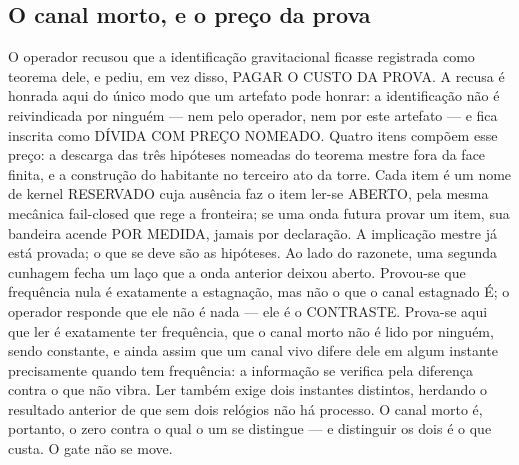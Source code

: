 \documentclass[11pt]{article}
\theoremstyle{definition}\newtheorem{deriv}{Derivação}
\begin{document}
\subsection*{O canal morto, e o pre\c{c}o da prova}O operador recusou que a identifica\c{c}\~ao gravitacional ficasse registrada como teorema dele, e pediu, em vez disso, PAGAR O CUSTO DA PROVA. A recusa \'e honrada aqui do \'unico modo que um artefato pode honrar: a identifica\c{c}\~ao n\~ao \'e reivindicada por ningu\'em --- nem pelo operador, nem por este artefato --- e fica inscrita como D\'IVIDA COM PRE\c{C}O NOMEADO. Quatro itens comp\~oem esse pre\c{c}o: a descarga das tr\^es hip\'oteses nomeadas do teorema mestre fora da face finita, e a constru\c{c}\~ao do habitante no terceiro ato da torre. Cada item \'e um nome de kernel RESERVADO cuja aus\^encia faz o item ler-se ABERTO, pela mesma mec\^anica fail-closed que rege a fronteira; se uma onda futura provar um item, sua bandeira acende POR MEDIDA, jamais por declara\c{c}\~ao. A implica\c{c}\~ao mestre j\'a est\'a provada; o que se deve s\~ao as hip\'oteses. Ao lado do razonete, uma segunda cunhagem fecha um la\c{c}o que a onda anterior deixou aberto. Provou-se que frequ\^encia nula \'e exatamente a estagna\c{c}\~ao, mas n\~ao o que o canal estagnado \'E; o operador responde que ele n\~ao \'e nada --- ele \'e o CONTRASTE. Prova-se aqui que ler \'e exatamente ter frequ\^encia, que o canal morto n\~ao \'e lido por ningu\'em, sendo constante, e ainda assim que um canal vivo difere dele em algum instante precisamente quando tem frequ\^encia: a informa\c{c}\~ao se verifica pela diferen\c{c}a contra o que n\~ao vibra. Ler tamb\'em exige dois instantes distintos, herdando o resultado anterior de que sem dois rel\'ogios n\~ao h\'a processo. O canal morto \'e, portanto, o zero contra o qual o um se distingue --- e distinguir os dois \'e o que custa. O gate n\~ao se move.
\end{document}
